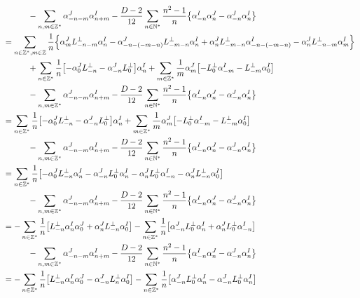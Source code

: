 \begin{align*}
    &\quad\quad\quad-\sum\limits_{n,m\in\mathbb Z^\ast}\alpha_{-n-m}^J\alpha^I_{n+m}-\frac{D-2}{12}\sum\limits_{n\in\mathbb N^\ast}\frac{n^2-1}{n}\qty{\alpha^I_{-n}\alpha^J_n-\alpha^J_{-n}\alpha^I_n}\\
    &=\sum\limits_{n\in\mathbb Z^\ast,m\in\mathbb Z}\frac1n\qty{\alpha^J_mL^\perp_{-n-m}\alpha^I_n-\alpha^J_{-n-\qty(-m-n)}L^\perp_{-m-n}\alpha^I_n+\alpha_n^JL_{-m-n}^\perp\alpha^I_{-n-\qty(-m-n)}-\alpha_n^JL^\perp_{-n-m}\alpha^I_{m}}\\
    &\quad\quad\quad+\sum\limits_{n\in\mathbb Z^\ast}\frac1n\qty[-\alpha_0^JL^\perp_{-n}-\alpha^J_{-n}L^\perp_0]\alpha_n^I+\sum\limits_{m\in\mathbb Z^\ast}\frac1m\alpha_m^J\qty[-L^\perp_0\alpha^I_{-m}-L^\perp_{-m}\alpha^I_0]\\
    &\quad\quad\quad-\sum\limits_{n,m\in\mathbb Z^\ast}\alpha_{-n-m}^J\alpha^I_{n+m}-\frac{D-2}{12}\sum\limits_{n\in\mathbb N^\ast}\frac{n^2-1}{n}\qty{\alpha^I_{-n}\alpha^J_n-\alpha^J_{-n}\alpha^I_n}\\
    &=\sum\limits_{n\in\mathbb Z^\ast}\frac1n\qty[-\alpha_0^JL^\perp_{-n}-\alpha^J_{-n}L^\perp_0]\alpha_n^I+\sum\limits_{m\in\mathbb Z^\ast}\frac1m\alpha_m^J\qty[-L^\perp_0\alpha^I_{-m}-L^\perp_{-m}\alpha^I_0]\\
    &\quad\quad\quad-\sum\limits_{n,m\in\mathbb Z^\ast}\alpha_{-n-m}^J\alpha^I_{n+m}-\frac{D-2}{12}\sum\limits_{n\in\mathbb N^\ast}\frac{n^2-1}{n}\qty{\alpha^I_{-n}\alpha^J_n-\alpha^J_{-n}\alpha^I_n}\\
    &=\sum\limits_{n\in\mathbb Z^\ast}\frac1n\qty[-\alpha_0^JL^\perp_{-n}\alpha_n^I-\alpha^J_{-n}L^\perp_0\alpha_n^I-\alpha_n^JL^\perp_0\alpha^I_{-n}-\alpha_n^JL^\perp_{-n}\alpha^I_0]\\
    &\quad\quad\quad-\sum\limits_{n,m\in\mathbb Z^\ast}\alpha_{-n-m}^J\alpha^I_{n+m}-\frac{D-2}{12}\sum\limits_{n\in\mathbb N^\ast}\frac{n^2-1}{n}\qty{\alpha^I_{-n}\alpha^J_n-\alpha^J_{-n}\alpha^I_n}\\
    &=-\sum\limits_{n\in\mathbb Z^\ast}\frac1n\qty[L^\perp_{-n}\alpha_n^I\alpha_0^J+\alpha_n^JL^\perp_{-n}\alpha^I_0]-\sum\limits_{n\in\mathbb Z^\ast}\frac1n\qty[\alpha^J_{-n}L^\perp_0\alpha_n^I+\alpha_n^JL^\perp_0\alpha^I_{-n}]\\
    &\quad\quad\quad-\sum\limits_{n,m\in\mathbb Z^\ast}\alpha_{-n-m}^J\alpha^I_{n+m}-\frac{D-2}{12}\sum\limits_{n\in\mathbb N^\ast}\frac{n^2-1}{n}\qty{\alpha^I_{-n}\alpha^J_n-\alpha^J_{-n}\alpha^I_n}\\
    &=-\sum\limits_{n\in\mathbb Z^\ast}\frac1n\qty[L^\perp_{-n}\alpha_n^I\alpha_0^J-\alpha_{-n}^JL^\perp_{n}\alpha^I_0]-\sum\limits_{n\in\mathbb Z^\ast}\frac1n\qty[\alpha^J_{-n}L^\perp_0\alpha_n^I-\alpha_{-n}^JL^\perp_0\alpha^I_{n}]\\

\end{align*}
